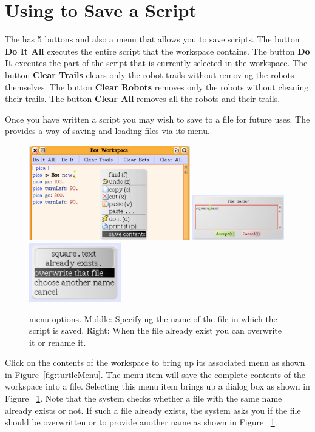 \section{Using \tw to Save a Script}
The \tw has 5 buttons and also a menu that allows you to save scripts.
The button \textbf{Do It All} executes the entire script that the workspace contains.
The button \textbf{Do It} executes the part of the script that is currently selected in  the workspace. The button \textbf{Clear Trails} clears only the robot trails without removing the robots themselves. The button \textbf{Clear Robots} removes only the robots without cleaning their trails. The button \textbf{Clear All} removes all the robots and their trails.

Once you have written a script you may wish to save to a file  for future uses. The \tw provides a way of saving and loading files via its menu. 

\begin{figure}[h]
\includegraphics[width=7cm]{saveContents}
\includegraphics[width=4cm]{enteringFileName}\includegraphics[width=4cm]{overwrite}
\caption{\tw menu options.  Middle: Specifying the name of the file in which the script is saved. Right: When the file already exist you can overwrite it or rename it.\label{fig:turtleMenu}\label{fig:enteringFileName}}
\end{figure}

Click on the contents of the workspace to bring up its associated menu as shown in Figure~\ref{fig:turtleMenu}. The menu item  will save the complete contents of the workspace into a file. Selecting this menu item brings up a dialog box as shown in Figure ~\ref{fig:enteringFileName}. Note that the system checks whether a file with the same name already exists or not. If such a file already exists, the system asks you if the file should be overwritten or to provide another name as shown in Figure ~\ref{fig:enteringFileName}.


